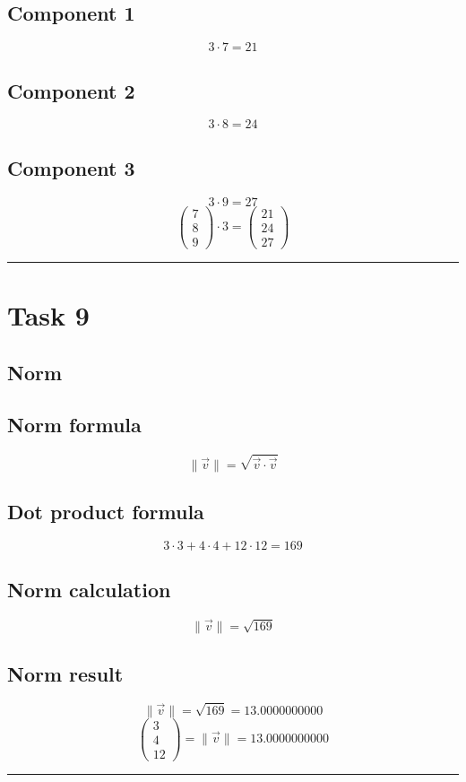 \documentclass{article}
\begin{document}
\subsection*{ \vspace{1em} Component 1}
\[
3 \cdot 7 = 21
\]
\subsection*{ \vspace{1em} Component 2}
\[
3 \cdot 8 = 24
\]
\subsection*{ \vspace{1em} Component 3}
\[
3 \cdot 9 = 27
\]
\[
\begin{pmatrix}7 \\ 8 \\ 9\end{pmatrix} \cdot 3 = \begin{pmatrix}21 \\ 24 \\ 27\end{pmatrix}
\]
\vspace{1em}
\hrule
\vspace{1em}
\section*{Task 9}

\subsection*{Norm}
\subsection*{ \vspace{1em} Norm formula}
\[
\|\vec{v}\| = \sqrt{\vec{v} \cdot \vec{v}}
\]
\subsection*{ \vspace{1em} Dot product formula}
\[
3 \cdot 3 + 4 \cdot 4 + 12 \cdot 12 = 169
\]
\subsection*{ \vspace{1em} Norm calculation}
\[
\|\vec{v}\| = \sqrt{169}
\]
\subsection*{ \vspace{1em} Norm result}
\[
\|\vec{v}\| = \sqrt{169} = 13.0000000000
\]
\[
\begin{pmatrix}3 \\ 4 \\ 12\end{pmatrix} = \|\vec{v}\| = 13.0000000000
\]
\vspace{1em}
\hrule
\vspace{1em}
\end{document}
